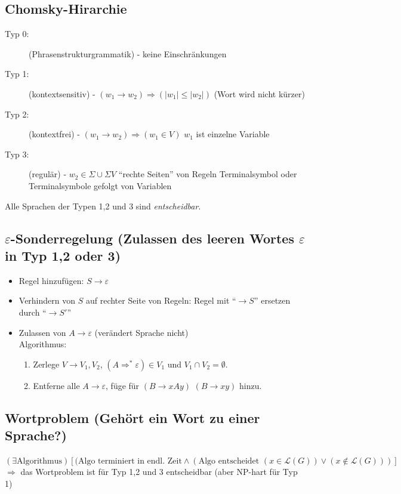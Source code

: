 \documentclass{scrartcl}
\begin{document}
\subsection*{Chomsky-Hirarchie}
\begin{shaded}
\begin{description}
\item[Typ 0:] (Phrasenstrukturgrammatik) - keine Einschränkungen
\item[Typ 1:] (kontextsensitiv) - $(w_1\to w_2) \Rightarrow (\vert w_1 \vert \leq \vert w_2 \vert)$ {\tiny (Wort wird nicht kürzer)}
\item[Typ 2:] (kontextfrei) - $(w_1\to w_2) \Rightarrow (w_1\in V)$ {\tiny $w_1$ ist einzelne Variable}
\item[Typ 3:] (regulär) - $w_2\in\Sigma\cup\Sigma V$ {\tiny "`rechte Seiten"' von Regeln Terminalsymbol oder Terminalsymbole gefolgt von Variablen}
\end{description}
\end{shaded}
Alle Sprachen der Typen 1,2 und 3 sind \emph{entscheidbar}.

\subsection*{$\varepsilon$-Sonderregelung {\tiny (Zulassen des leeren Wortes $\varepsilon$ in Typ 1,2 oder 3)}}
\begin{itemize}
\item Regel hinzufügen: $S\to\varepsilon$
\item Verhindern von $S$ auf rechter Seite von Regeln: Regel mit "`$\to S$"' ersetzen durch "`$\to S'$"'
\item Zulassen von $A\to\varepsilon$ {\tiny (verändert Sprache nicht)}\\
Algorithmus:
\begin{enumerate}
\item Zerlege $V\to V_1,V_2$, $(A\Rightarrow^*\varepsilon)\in V_1$ und $V_1\cap V_2=\emptyset$.
\item Entferne alle $A\to\varepsilon$, füge für $(B\to xAy)$ $(B\to xy)$ hinzu.
\end{enumerate}
\end{itemize}

\subsection*{Wortproblem {\tiny (Gehört ein Wort zu einer Sprache?)}}
$(\exists \textrm{Algorithmus})[(\textrm{Algo terminiert in endl. Zeit}\wedge(\textrm{Algo entscheidet } (x\in\mathcal{L}(G))\vee(x\not\in\mathcal{L}(G)))]$ \\
$\Rightarrow$ das Wortproblem ist für Typ 1,2 und 3 entscheidbar (aber NP-hart für Typ 1)
\end{document}
